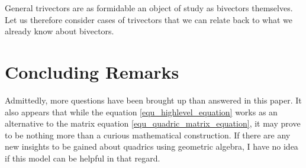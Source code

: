 \documentclass{ecgd-l}
\theoremstyle{definition}
\theoremstyle{remark}
\numberwithin{equation}{section}
\begin{document}
General trivectors are as formidable an object of study as bivectors themselves.
Let us therefore consider cases of trivectors that we can relate back to what
we already know about bivectors.

\section{Concluding Remarks}

Admittedly, more questions have been brought up than answered in this paper.
It also appears that while the equation \eqref{equ_highlevel_equation}
works as an alternative to the matrix equation \eqref{equ_quadric_matrix_equation},
it may prove to be nothing more than a curious mathematical construction.  If there are
any new insights to be gained about quadrics using geometric algebra, I have no idea
if this model can be helpful in that regard.




\end{document}

